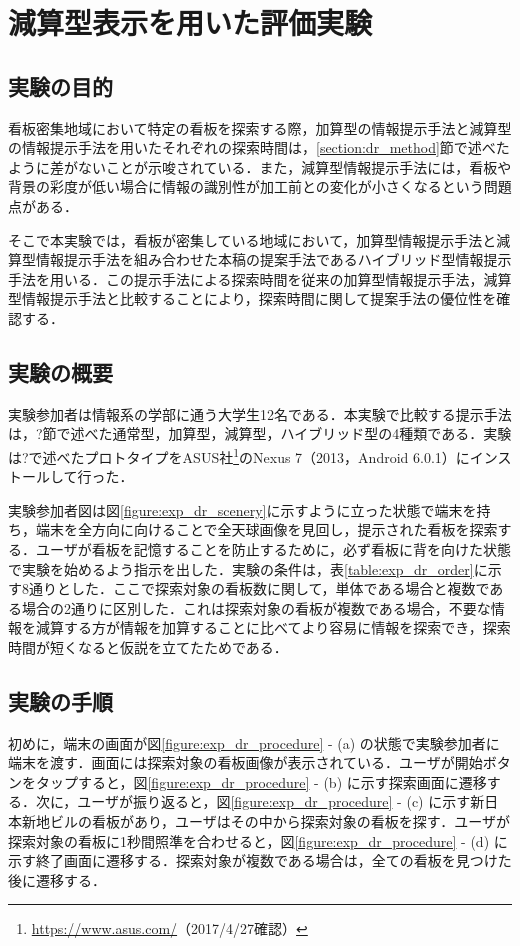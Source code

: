 \chapter{減算型表示を用いた評価実験}
\label{chapter:experiment_dr}
\section{実験の目的}
  看板密集地域において特定の看板を探索する際，加算型の情報提示手法と減算型の情報提示手法を用いたそれぞれの探索時間は，\ref{section:dr_method}節で述べたように差がないことが示唆されている．また，減算型情報提示手法には，看板や背景の彩度が低い場合に情報の識別性が加工前との変化が小さくなるという問題点がある．

  そこで本実験では，看板が密集している地域において，加算型情報提示手法と減算型情報提示手法を組み合わせた本稿の提案手法であるハイブリッド型情報提示手法を用いる．この提示手法による探索時間を従来の加算型情報提示手法，減算型情報提示手法と比較することにより，探索時間に関して提案手法の優位性を確認する．

\section{実験の概要}
  実験参加者は情報系の学部に通う大学生12名である．本実験で比較する提示手法は，?節で述べた通常型，加算型，減算型，ハイブリッド型の4種類である．実験は?で述べたプロトタイプをASUS社\footnote{\url{https://www.asus.com/}（2017/4/27確認）}のNexus 7（2013，Android 6.0.1）にインストールして行った．

  実験参加者図は図\ref{figure:exp_dr_scenery}に示すように立った状態で端末を持ち，端末を全方向に向けることで全天球画像を見回し，提示された看板を探索する．ユーザが看板を記憶することを防止するために，必ず看板に背を向けた状態で実験を始めるよう指示を出した．実験の条件は，表\ref{table:exp_dr_order}に示す8通りとした．ここで探索対象の看板数に関して，単体である場合と複数である場合の2通りに区別した．これは探索対象の看板が複数である場合，不要な情報を減算する方が情報を加算することに比べてより容易に情報を探索でき，探索時間が短くなると仮説を立てたためである．

\section{実験の手順}
  初めに，端末の画面が図\ref{figure:exp_dr_procedure} - (a) の状態で実験参加者に端末を渡す．画面には探索対象の看板画像が表示されている．ユーザが開始ボタンをタップすると，図\ref{figure:exp_dr_procedure} - (b) に示す探索画面に遷移する．次に，ユーザが振り返ると，図\ref{figure:exp_dr_procedure} - (c) に示す新日本新地ビルの看板があり，ユーザはその中から探索対象の看板を探す．ユーザが探索対象の看板に1秒間照準を合わせると，図\ref{figure:exp_dr_procedure} - (d) に示す終了画面に遷移する．探索対象が複数である場合は，全ての看板を見つけた後に遷移する．


